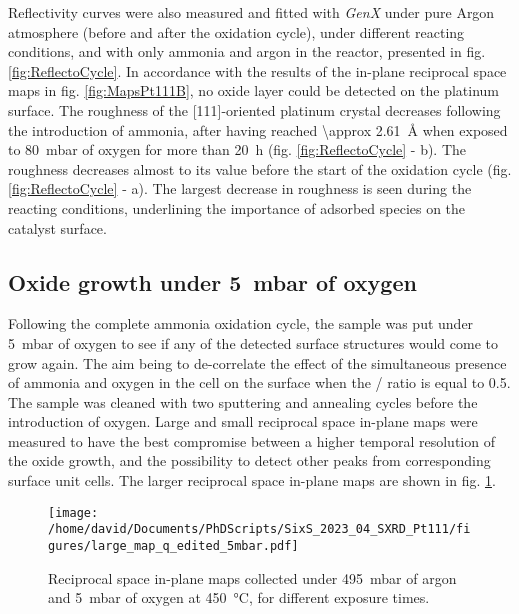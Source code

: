 Reflectivity curves were also measured and fitted with \textit{GenX} under pure Argon atmosphere (before and after the oxidation cycle), under different reacting conditions, and with only ammonia and argon in the reactor, presented in fig. \ref{fig:ReflectoCycle}.
In accordance with the results of the in-plane reciprocal space maps in fig. \ref{fig:MapsPt111B}, no oxide layer could be detected on the platinum surface.
The roughness of the [111]-oriented platinum crystal decreases following the introduction of ammonia, after having reached \qty{\approx 2.61}{\angstrom} when exposed to \qty{80}{\milli\bar} of oxygen for more than \qty{20}{\hour} (fig. \ref{fig:ReflectoCycle} - b).
The roughness decreases almost to its value before the start of the oxidation cycle (fig. \ref{fig:ReflectoCycle} - a).
The largest decrease in roughness is seen during the reacting conditions, underlining the importance of adsorbed species on the catalyst surface.

\subsection{Oxide growth under \qty{5}{\milli\bar} of oxygen}

Following the complete ammonia oxidation cycle, the sample was put under \qty{5}{\milli\bar} of oxygen to see if any of the detected surface structures would come to grow again.
The aim being to de-correlate the effect of the simultaneous presence of ammonia and oxygen in the cell on the surface when the / ratio is equal to \num{0.5}.
The sample was cleaned with two sputtering and annealing cycles before the introduction of oxygen.
Large and small reciprocal space in-plane maps were measured to have the best compromise between a higher temporal resolution of the oxide growth, and the possibility to detect other peaks from corresponding surface unit cells.
The larger reciprocal space in-plane maps are shown in fig. \ref{fig:LargeMapsPt111LowOxygen}.

\begin{figure}[!htb]
    \centering
    \texttt{[image: /home/david/Documents/PhDScripts/SixS\_2023\_04\_SXRD\_Pt111/figures/large\_map\_q\_edited\_5mbar.pdf]}
    \caption{
        Reciprocal space in-plane maps collected under \qty{495}{\milli\bar} of argon and \qty{5}{\milli\bar} of oxygen at \qty{450}{\degreeCelsius}, for different exposure times.
    }
    \label{fig:LargeMapsPt111LowOxygen}
\end{figure}

